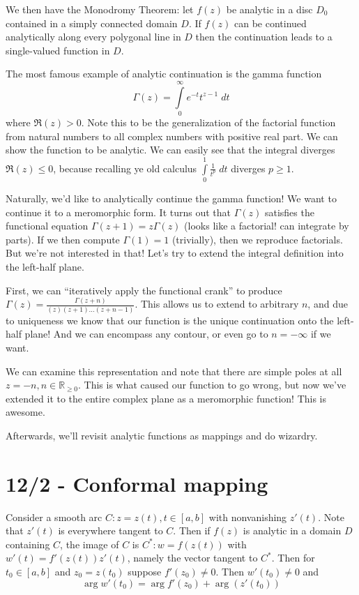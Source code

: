 \documentclass[10pt]{report}
\begin{document}
We then have the Monodromy Theorem: let $f(z)$ be analytic in a disc $D_0$ contained in a simply connected domain $D$. If $f(z)$ can be continued analytically along every polygonal line in $D$ then the continuation leads to a single-valued function in $D$.

The most famous example of analytic continuation is the gamma function 
$$\Gamma(z) = \displaystyle\int\limits_{0}^{\infty}e^{-t}t^{z-1}\;dt$$
where $\Re(z) > 0$. Note this to be the generalization of the factorial function from natural numbers to all complex numbers with positive real part. We can show the function to be analytic. We can easily see that the integral diverges $\Re(z) \leq 0$, because recalling ye old calculus $\displaystyle\int\limits_{0}^{1}\frac{1}{t^p}\;dt$ diverges $p \geq 1$.

Naturally, we'd like to analytically continue the gamma function! We want to continue it to a meromorphic form. It turns out that $\Gamma(z)$ satisfies the functional equation $\Gamma(z+1) = z\Gamma(z)$ (looks like a factorial! can integrate by parts). If we then compute $\Gamma(1) = 1$ (trivially), then we reproduce factorials. But we're not interested in that! Let's try to extend the integral definition into the left-half plane.

First, we can ``iteratively apply the functional crank'' to produce $\Gamma(z) = \frac{\Gamma(z+n)}{(z)(z+1)\dots(z+n-1)}$. This allows us to extend to arbitrary $n$, and due to uniqueness we know that our function is the unique continuation onto the left-half plane! And we can encompass any contour, or even go to $n=-\infty$ if we want.

We can examine this representation and note that there are simple poles at all $z = -n, n \in\mathbb{R}_{\geq 0}$. This is what caused our function to go wrong, but now we've extended it to the entire complex plane as a meromorphic function! This is awesome.

Afterwards, we'll revisit analytic functions as mappings and do wizardry. 

\chapter{12/2 - Conformal mapping}

Consider a smooth arc $C: z = z(t), t \in [a,b]$ with nonvanishing $z'(t)$. Note that $z'(t)$ is everywhere tangent to $C$. Then if $f(z)$ is analytic in a domain $D$ containing $C$, the image of $C$ is $C^*: w=f(z(t))$ with $w'(t) = f'(z(t))z'(t)$, namely the vector tangent to $C^*$. Then for $t_0\in[a,b]$ and $z_0 = z(t_0)$ suppose $f'(z_0) \neq 0$. Then $w'(t_0) \neq 0$ and
$$\arg w'(t_0) = \arg f'(z_0) + \arg(z'(t_0))$$
\end{document}

